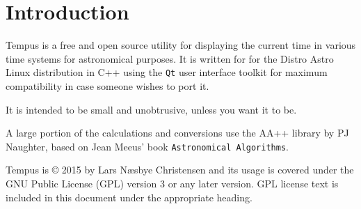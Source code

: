 \section{Introduction}
Tempus is a free and open source utility for displaying the current time in various time systems for astronomical purposes. It is written for for the Distro Astro Linux distribution in C++ using the \texttt{Qt} user interface toolkit for maximum compatibility in case someone wishes to port it.

It is intended to be small and unobtrusive, unless you want it to be.

A large portion of the calculations and conversions use the AA++ library by PJ Naughter, based on Jean Meeus' book \texttt{Astronomical Algorithms}.

Tempus is {\copyright} 2015 by Lars N{\ae}sbye Christensen and its usage is covered under the GNU Public License (GPL) version 3 or any later version. GPL license text is included in this document under the appropriate heading.

